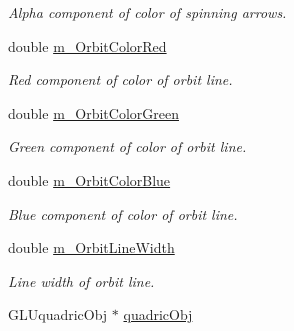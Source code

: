 \begin{DoxyCompactItemize}
\begin{DoxyCompactList}\small\item\em Alpha component of color of spinning arrows. \end{DoxyCompactList}\item 
\hypertarget{class_circular_orbit_belief_ac299d51e5f2b01f53fa290f1681fb155}{
double \hyperlink{class_circular_orbit_belief_ac299d51e5f2b01f53fa290f1681fb155}{m\_\-OrbitColorRed}}
\label{class_circular_orbit_belief_ac299d51e5f2b01f53fa290f1681fb155}

\begin{DoxyCompactList}\small\item\em Red component of color of orbit line. \end{DoxyCompactList}\item 
\hypertarget{class_circular_orbit_belief_a7458a8813ee77b0d821da71486ae9f4d}{
double \hyperlink{class_circular_orbit_belief_a7458a8813ee77b0d821da71486ae9f4d}{m\_\-OrbitColorGreen}}
\label{class_circular_orbit_belief_a7458a8813ee77b0d821da71486ae9f4d}

\begin{DoxyCompactList}\small\item\em Green component of color of orbit line. \end{DoxyCompactList}\item 
\hypertarget{class_circular_orbit_belief_ac5280e88c966d8e0217d2cf3eb6217c3}{
double \hyperlink{class_circular_orbit_belief_ac5280e88c966d8e0217d2cf3eb6217c3}{m\_\-OrbitColorBlue}}
\label{class_circular_orbit_belief_ac5280e88c966d8e0217d2cf3eb6217c3}

\begin{DoxyCompactList}\small\item\em Blue component of color of orbit line. \end{DoxyCompactList}\item 
\hypertarget{class_circular_orbit_belief_a680f12532090b5f536850e81d10e2a25}{
double \hyperlink{class_circular_orbit_belief_a680f12532090b5f536850e81d10e2a25}{m\_\-OrbitLineWidth}}
\label{class_circular_orbit_belief_a680f12532090b5f536850e81d10e2a25}

\begin{DoxyCompactList}\small\item\em Line width of orbit line. \end{DoxyCompactList}\item 
\hypertarget{class_circular_orbit_belief_a67ff5746924af468595e103752c0edb8}{
GLUquadricObj $\ast$ \hyperlink{class_circular_orbit_belief_a67ff5746924af468595e103752c0edb8}{quadricObj}}
\label{class_circular_orbit_belief_a67ff5746924af468595e103752c0edb8}


\end{DoxyCompactItemize}
